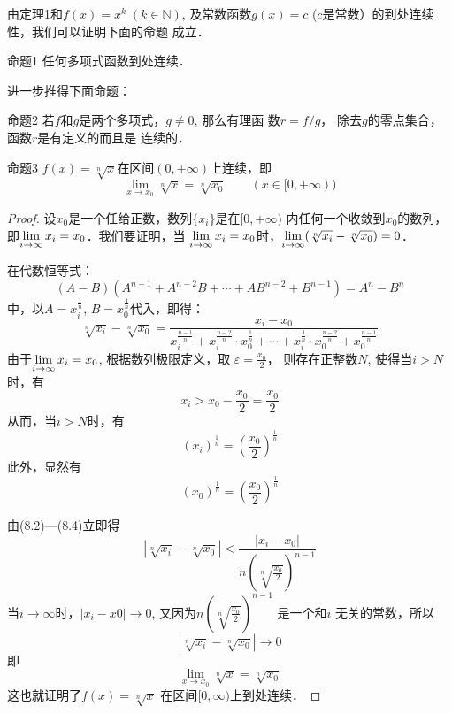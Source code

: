 由定理1和$f(x)=x^k\; (k\in\mathbb{N})$, 及常数函数$g(x)=c$ ($c$是常数）的到处连续性，我们可以证明下面的命题
成立．

\begin{blk}{命题1}
    任何多项式函数到处连续．
\end{blk}

进一步推得下面命题：

\begin{blk}{命题2}
    若$f$和$g$是两个多项式，$g\ne 0$, 那么有理函
数$r=f/g$，
除去$g$的零点集合，函数$r$是有定义的而且是
连续的．
\end{blk}

\begin{blk}{命题3}
    $f(x)=\sqrt[n]{x}$在区间$(0,+\infty)$上连续，即 
\[\lim_{x\to x_0}\sqrt[n]{x}=\sqrt[n]{x_0}\qquad (x\in[0,+\infty))\]
\end{blk}

\begin{proof}
    设$x_0$是一个任给正数，数列$\{x_i\}$是在$[0,+\infty)$
内任何一个收敛到$x_0$的数列，即$\displaystyle\lim_{i\to \infty} x_i=x_0$．我们要证明，当
$\displaystyle\lim_{i\to\infty} x_i=x_0$时，$\displaystyle\lim_{i\to\infty} (\sqrt[n]{x_i}-\sqrt[n]{x_0})=0$．

在代数恒等式：
\[(A-B)\left(A^{n-1}+A^{n-2}B+\cdots +AB^{n-2}+B^{n-1}\right)=A^n-B^n\]
中，以$A=x_i^{\tfrac{1}{n}}$, $B=x_0^{\tfrac{1}{n}}$代入，即得：
\begin{equation}
\sqrt[n]{x_i}-\sqrt[n]{x_0}=\frac{x_i-x_0}{x_i^{\tfrac{n-1}{n}}+x^{\tfrac{n-2}{n}}_i\cdot x_0^{\tfrac{1}{n}}+\cdots +x^{\tfrac{1}{n}}_i\cdot x_0^{\tfrac{n-2}{n}} + x_0^{\tfrac{n-1}{n}}} 
\end{equation}
由于$\displaystyle\lim_{i\to\infty}x_i=x_0$, 根据数列极限定义，取
$\varepsilon=\frac{x_0}{2}$，
则存在正整数$N$, 使得当$i>N$时，有
\[x_i>x_0-\frac{x_0}{2}=\frac{x_0}{2}\]
从而，当$i>N$时，有
\begin{equation}
    (x_i)^{\tfrac{1}{n}}=\left(\frac{x_0}{2}\right)^{\tfrac{1}{n}}
\end{equation}
此外，显然有
\begin{equation}
    (x_0)^{\tfrac{1}{n}}=\left(\frac{x_0}{2}\right)^{\tfrac{1}{n}}
\end{equation}

由(8.2)---(8.4)立即得
\[\left|\sqrt[n]{x_i}-\sqrt[n]{x_0}\right|<\frac{|x_i-x_0|}{n\left(\sqrt[n]{\frac{x_0}{2}}\right)^{n-1}}\]
当$i\to\infty$时，$|x_i-x0|\to 0$, 又因为$n\left(\sqrt[n]{\frac{x_0}{2}}\right)^{n-1}$
是一个和$i$
无关的常数，所以
\[\left|\sqrt[n]{x_i}-\sqrt[n]{x_0}\right|\to 0\]
即
\[\lim_{x\to x_0} \sqrt[n]{x}=\sqrt[n]{x_0}\]
这也就证明了$f(x)=\sqrt[n]{x}$ 在区间$[0,\infty)$上到处连续．
\end{proof}


